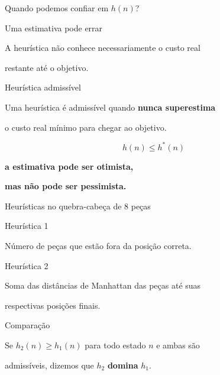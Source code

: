 \documentclass[xcolor=dvipsnames,table]{beamer}
\begin{document}
\begin{frame}{Quando podemos confiar em $h(n)$?}

    \begin{block}{Uma estimativa pode errar}

        A heurística não conhece necessariamente o custo real

        restante até o objetivo.

    \end{block}

    \begin{block}{Heurística admissível}

        Uma heurística é admissível quando \textbf{nunca superestima}

        o custo real mínimo para chegar ao objetivo.

        \[
        h(n)\leq h^*(n)
        \]

    \end{block}

    \begin{center}

        \Large

        \textbf{a estimativa pode ser otimista,}

        \quad

        \textbf{mas não pode ser pessimista.}

    \end{center}

\end{frame}

\begin{frame}{Heurísticas no quebra-cabeça de 8 peças}

    \begin{block}{Heurística 1}

        Número de peças que estão fora da posição correta.

    \end{block}

    \begin{block}{Heurística 2}

        Soma das distâncias de Manhattan das peças até suas

        respectivas posições finais.

    \end{block}

    \begin{block}{Comparação}

        Se $h_2(n)\geq h_1(n)$ para todo estado $n$ e ambas são

        admissíveis, dizemos que $h_2$ \textbf{domina} $h_1$.

    \end{block}

\end{frame}
\end{document}
